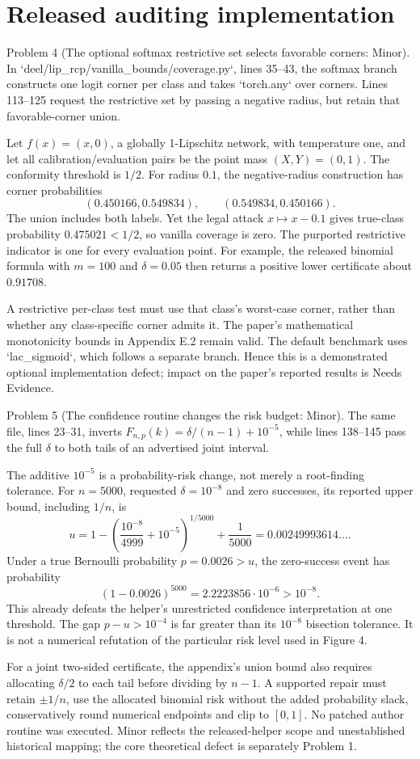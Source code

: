 \documentclass[10pt]{article}
\begin{document}
\section*{Released auditing implementation}
Problem 4 (The optional softmax restrictive set selects favorable corners: Minor).  In `deel/lip\_rcp/vanilla\_bounds/coverage.py`, lines 35–43, the softmax branch constructs one logit corner per class and takes `torch.any` over corners. Lines 113–125 request the restrictive set by passing a negative radius, but retain that favorable-corner union.\par
Let \(f(x)=(x,0)\), a globally 1-Lipschitz network, with temperature one, and let all calibration/evaluation pairs be the point mass \((X,Y)=(0,1)\). The conformity threshold is \(1/2\). For radius \(0.1\), the negative-radius construction has corner probabilities \[(0.450166,0.549834),\qquad(0.549834,0.450166).\] The union includes both labels. Yet the legal attack \(x\mapsto x-0.1\) gives true-class probability \(0.475021<1/2\), so vanilla coverage is zero. The purported restrictive indicator is one for every evaluation point. For example, the released binomial formula with \(m=100\) and \(\delta=0.05\) then returns a positive lower certificate about \(0.91708\).\par
A restrictive per-class test must use that class’s worst-case corner, rather than whether any class-specific corner admits it. The paper’s mathematical monotonicity bounds in Appendix E.2 remain valid. The default benchmark uses `lac\_sigmoid`, which follows a separate branch. Hence this is a demonstrated optional implementation defect; impact on the paper’s reported results is Needs Evidence.\par
Problem 5 (The confidence routine changes the risk budget: Minor).  The same file, lines 23–31, inverts \(F_{n,p}(k)=\delta/(n-1)+10^{-5}\), while lines 138–145 pass the full \(\delta\) to both tails of an advertised joint interval.\par
The additive \(10^{-5}\) is a probability-risk change, not merely a root-finding tolerance. For \(n=5000\), requested \(\delta=10^{-8}\) and zero successes, its reported upper bound, including \(1/n\), is \[u=1-\left(\frac{10^{-8}}{4999}+10^{-5}\right)^{1/5000}
 +\frac1{5000}=0.00249993614\ldots.\] Under a true Bernoulli probability \(p=0.0026>u\), the zero-success event has probability \[(1-0.0026)^{5000}=2.2223856\cdot10^{-6}>10^{-8}.\] This already defeats the helper’s unrestricted confidence interpretation at one threshold. The gap \(p-u>10^{-4}\) is far greater than its \(10^{-8}\) bisection tolerance. It is not a numerical refutation of the particular risk level used in Figure 4.\par
For a joint two-sided certificate, the appendix’s union bound also requires allocating \(\delta/2\) to each tail before dividing by \(n-1\). A supported repair must retain \(\pm1/n\), use the allocated binomial risk without the added probability slack, conservatively round numerical endpoints and clip to \([0,1]\). No patched author routine was executed. Minor reflects the released-helper scope and unestablished historical mapping; the core theoretical defect is separately Problem 1.\par
\end{document}
